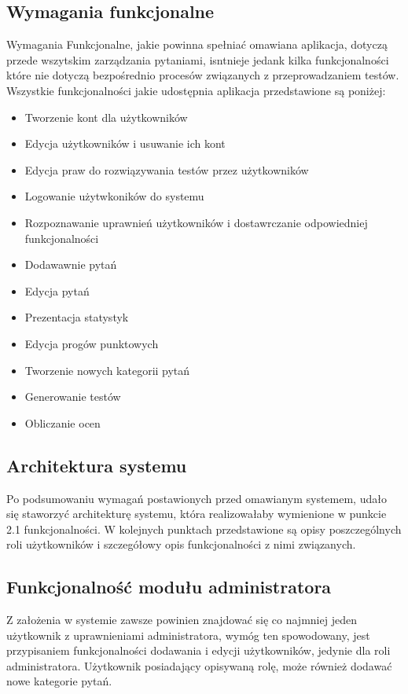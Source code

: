 \documentclass[a4paper, titlepage]{article}
\begin{document}
\subsection{Wymagania funkcjonalne}

Wymagania Funkcjonalne, jakie powinna spełniać omawiana aplikacja, dotyczą przede wszytskim zarządzania pytaniami, isntnieje jedank kilka funkcjonalności które nie dotyczą bezpośrednio procesów związanych z przeprowadzaniem testów.
\\Wszystkie funkcjonalności jakie udostępnia aplikacja przedstawione są poniżej:
\begin{itemize}
\item Tworzenie kont dla użytkowników
\item Edycja użytkowników i usuwanie ich kont
\item Edycja praw do rozwiązywania testów przez użytkowników
\item Logowanie użytwkoników do systemu
\item Rozpoznawanie uprawnień użytkowników i dostawrczanie odpowiedniej funkcjonalności
\item Dodawawnie pytań
\item Edycja pytań
\item Prezentacja statystyk
\item Edycja progów punktowych
\item Tworzenie nowych kategorii pytań
\item Generowanie testów
\item Obliczanie ocen
\end{itemize}

\subsection{Architektura systemu}
Po podsumowaniu wymagań postawionych przed omawianym systemem, udało się staworzyć architekturę systemu, która realizowałaby wymienione w punkcie 2.1 funkcjonalności. W kolejnych punktach przedstawione są opisy poszczególnych roli użytkowników i szczegółowy opis funkcjonalności z nimi związanych.
\subsection{Funkcjonalność modułu administratora}
	Z założenia w systemie zawsze powinien znajdować się co najmniej jeden użytkownik z uprawnieniami administratora, wymóg ten spowodowany, jest przypisaniem funkcjonalności dodawania i edycji użytkowników, jedynie dla roli administratora. Użytkownik posiadający opisywaną rolę, może również dodawać nowe kategorie pytań.
\end{document}
